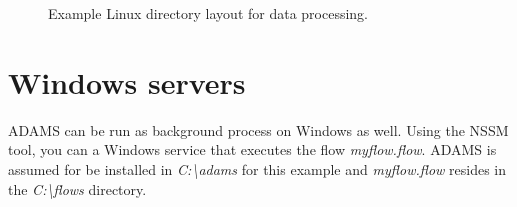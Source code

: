 \begin{figure}[htb]
  \caption{Example Linux directory layout for data processing.}
  \label{example_linux_dir_layout_data_processing}
\end{figure}

\section{Windows servers}
ADAMS can be run as background process on Windows as well. Using the NSSM\cite{nssm}
tool, you can a Windows service that executes the flow \textit{myflow.flow}.
ADAMS is assumed for be installed in \textit{C:\textbackslash adams} for this
example and \textit{myflow.flow} resides in the \textit{C:\textbackslash flows}
directory.

